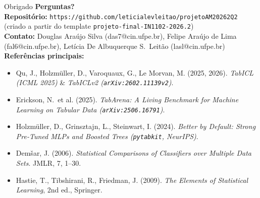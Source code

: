\documentclass[aspectratio=169,11pt]{beamer}
\begin{document}
\begin{frame}{Obrigado}
    \centering
    \textbf{\Large Perguntas?}
    \\[0.8em]
    \footnotesize
    \textbf{Repositório:} \texttt{https://github.com/leticialevleitao/projetoAM20262Q2}\\
    {\scriptsize (criado a partir do template \texttt{projeto-final-IN1102-2026.2})}\\[0.5em]
    \textbf{Contato:} Douglas Araújo Silva (das7@cin.ufpe.br), Felipe Araújo de Lima (fal6@cin.ufpe.br), Letícia De Albuquerque S.\ Leitão (lasl@cin.ufpe.br)\\[0.6em]
    \textbf{Referências principais:}
    \begin{itemize}
        \scriptsize
        \item Qu, J., Holzmüller, D., Varoquaux, G., Le Morvan, M. (2025, 2026). \textit{TabICL (ICML 2025)} \& \textit{TabICLv2 (\texttt{arXiv:2602.11139v2})}.
        \item Erickson, N.\ et al. (2025). \textit{TabArena: A Living Benchmark for Machine Learning on Tabular Data (\texttt{arXiv:2506.16791})}.
        \item Holzmüller, D., Grinsztajn, L., Steinwart, I. (2024). \textit{Better by Default: Strong Pre-Tuned MLPs and Boosted Trees (\texttt{pytabkit}, NeurIPS)}.
        \item Dem\v{s}ar, J. (2006). \textit{Statistical Comparisons of Classifiers over Multiple Data Sets}. JMLR, 7, 1--30.
        \item Hastie, T., Tibshirani, R., Friedman, J. (2009). \textit{The Elements of Statistical Learning}, 2nd ed., Springer.
    \end{itemize}
\end{frame}
\end{document}
